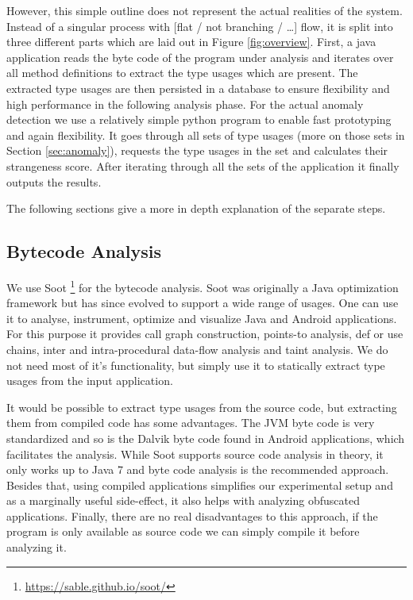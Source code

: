 However, this simple outline does not represent the actual realities of the system.
Instead of a singular process with [flat / not branching / \ldots] flow, it is split into three different parts which are laid out in Figure \ref{fig:overview}.
First, a java application reads the byte code of the program under analysis and iterates over all method definitions to extract the type usages which are present.
The extracted type usages are then persisted in a database to ensure flexibility and high performance in the following analysis phase.
For the actual anomaly detection we use a relatively simple python program to enable fast prototyping and again flexibility.
It goes through all sets of type usages (more on those sets in Section \ref{sec:anomaly}), requests the type usages in the set and calculates their strangeness score.
After iterating through all the sets of the application it finally outputs the results.

The following sections give a more in depth explanation of the separate steps.

\subsection{Bytecode Analysis}\label{sec:bytecode}

We use Soot \footnote{\url{https://sable.github.io/soot/}} for the bytecode analysis.
Soot was originally a Java optimization framework but has since evolved to support a wide range of usages.
One can use it to analyse, instrument, optimize and visualize Java and Android applications.
For this purpose it provides call graph construction, points-to analysis, def or use chains, inter and intra-procedural data-flow analysis and taint analysis.
We do not need most of it's functionality, but simply use it to statically extract type usages from the input application.

It would be possible to extract type usages from the source code, but extracting them from compiled code has some advantages.
The JVM byte code is very standardized and so is the Dalvik byte code found in Android applications, which facilitates the analysis.
While Soot supports source code analysis in theory, it only works up to Java 7 and byte code analysis is the recommended approach.
Besides that, using compiled applications simplifies our experimental setup and as a marginally useful side-effect, it also helps with analyzing obfuscated applications.
Finally, there are no real disadvantages to this approach, if the program is only available as source code we can simply compile it before analyzing it.

